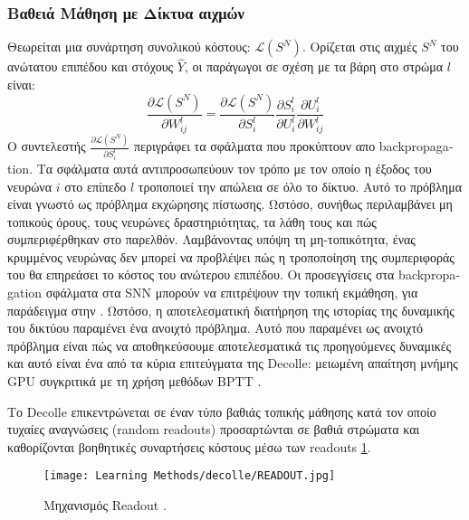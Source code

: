 \documentclass[12pt]{report}
\begin{document}
\subsubsection{Βαθειά Μάθηση με Δίκτυα αιχμών}
Θεωρείται μια συνάρτηση συνολικού κόστους: $\mathcal{L}\left(S^{N}\right)$. Ορίζεται στις αιχμές $S^{N} $ του ανώτατου επιπέδου και στόχους $\hat{Y}$, οι παράγωγοι σε σχέση με τα βάρη στο στρώμα $l$ είναι:
\begin{equation}
\frac{\partial \mathcal{L}\left(S^{N}\right)}{\partial W_{i j}^{l}}=\frac{\partial \mathcal{L}\left(S^{N}\right)}{\partial S_{i}^{l}} \frac{\partial S_{i}^{l}}{\partial U_{i}^{l}} \frac{\partial U_{i}^{l}}{\partial W_{i j}^{l}}
\end{equation}
Ο συντελεστής $\frac{\partial \mathcal{L}\left(S^{N}\right)}{\partial S_{i}^{l}}$ περιγράφει τα σφάλματα που προκύπτουν απο \textlatin{backpropagation}. Τα σφάλματα αυτά αντιπροσωπεύουν τον τρόπο με τον οποίο η έξοδος του νευρώνα $i$ στο επίπεδο $l$ τροποποιεί την απώλεια σε όλο το δίκτυο. Αυτό το πρόβλημα είναι γνωστό ως πρόβλημα εκχώρησης πίστωσης. Ωστόσο, συνήθως περιλαμβάνει μη τοπικούς όρους, τους νευρώνες δραστηριότητας, τα λάθη τους και πώς συμπεριφέρθηκαν στο παρελθόν. Λαμβάνοντας υπόψη τη μη-τοπικότητα, ένας κρυμμένος νευρώνας δεν μπορεί να προβλέψει πώς η τροποποίηση της συμπεριφοράς του θα επηρεάσει το κόστος του ανώτερου επιπέδου. Οι προσεγγίσεις στα \textlatin{backpropagation} σφάλματα στα \textlatin{SNN} μπορούν να επιτρέψουν την τοπική εκμάθηση, για παράδειγμα στην \cite{lillicrap2016}. Ωστόσο, η αποτελεσματική διατήρηση της ιστορίας της δυναμικής του δικτύου παραμένει ένα ανοιχτό πρόβλημα. Αυτό που παραμένει ως ανοιχτό πρόβλημα είναι πώς να αποθηκεύσουμε αποτελεσματικά τις προηγούμενες δυναμικές και αυτό είναι ένα από τα κύρια επιτεύγματα της \textlatin{Decolle}: μειωμένη απαίτηση μνήμης \textlatin{GPU} συγκριτικά με τη χρήση μεθόδων \textlatin{BPTT} .

Το \textlatin{Decolle} επικεντρώνεται σε έναν τύπο βαθιάς τοπικής μάθησης κατά τον οποίο τυχαίες αναγνώσεις (\textlatin{random readouts}) προσαρτώνται σε βαθιά στρώματα και καθορίζονται βοηθητικές συναρτήσεις κόστους μέσω των \textlatin{readouts} \ref{fig:readout}.
\begin{figure}[htp]
    \centering
    \texttt{[image: Learning Methods/decolle/READOUT.jpg]}
    \caption{Μηχανισμός \textlatin{Readout}  . 
    \label{fig:readout}}
\end{figure}
\end{document}
